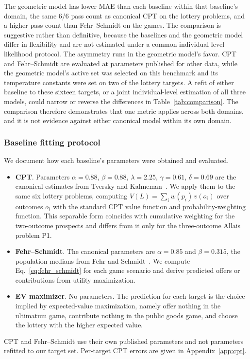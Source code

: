 \documentclass[journal]{IEEEtran}
\begin{document}
The geometric model has lower MAE than each baseline within that baseline's domain, the same 6/6 pass count as canonical CPT on the lottery problems, and a higher pass count than Fehr--Schmidt on the games.
The comparison is suggestive rather than definitive, because the baselines and the geometric model differ in flexibility and are not estimated under a common individual-level likelihood protocol.
The asymmetry runs in the geometric model's favor.
CPT and Fehr--Schmidt are evaluated at parameters published for other data, while the geometric model's active set was selected on this benchmark and its temperature constants were set on two of the lottery targets.
A refit of either baseline to these sixteen targets, or a joint individual-level estimation of all three models, could narrow or reverse the differences in Table~\ref{tab:comparison}.
The comparison therefore demonstrates that one metric applies across both domains, and it is not evidence against either canonical model within its own domain.

\subsubsection{Baseline fitting protocol}
We document how each baseline's parameters were obtained and evaluated.
\begin{itemize}
    \item \textbf{CPT}. Parameters $\alpha=0.88$, $\beta=0.88$, $\lambda=2.25$, $\gamma=0.61$, $\delta=0.69$ are the canonical estimates from Tversky and Kahneman~\cite{tversky1992}.
    We apply them to the same six lottery problems, computing $V(L) = \sum_i w(p_i)\, v(o_i)$ over outcomes $o_i$ with the standard CPT value function and probability-weighting function. This separable form coincides with cumulative weighting for the two-outcome prospects and differs from it only for the three-outcome Allais problem P1.
    \item \textbf{Fehr--Schmidt}. The canonical parameters are $\alpha=0.85$ and $\beta=0.315$, the population medians from Fehr and Schmidt~\cite{fehr1999}.
    We compute Eq.~\eqref{eq:fehr_schmidt} for each game scenario and derive predicted offers or contributions from utility maximization.
    \item \textbf{EV maximizer}. No parameters.
    The prediction for each target is the choice implied by expected-value maximization, namely offer nothing in the ultimatum game, contribute nothing in the public goods game, and choose the lottery with the higher expected value.
\end{itemize}
CPT and Fehr--Schmidt use their own published parameters and not parameters refitted to our target set.
Per-target CPT errors are given in Appendix~\ref{app:cpt}.
\end{document}
